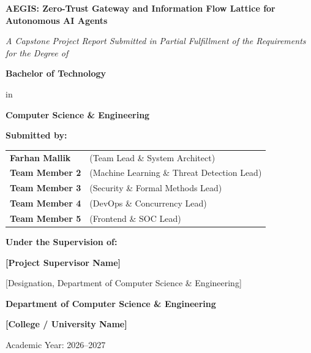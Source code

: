 \begin{titlepage}
\begin{center}

\vspace*{0.5cm}

{\Huge \bfseries AEGIS: Zero-Trust Gateway and Information Flow Lattice for Autonomous AI Agents\par}

\vspace{0.8cm}
{\Large \textit{A Capstone Project Report Submitted in Partial Fulfillment of the Requirements for the Degree of}\par}
\vspace{0.4cm}
{\Large \bfseries Bachelor of Technology\par}
{\large in\par}
{\Large \bfseries Computer Science \& Engineering\par}

\vspace{1.2cm}

{\large \textbf{Submitted by:}\par}
\vspace{0.3cm}
\begin{tabular}{ll}
\textbf{Farhan Mallik} & (Team Lead \& System Architect) \\
\textbf{Team Member 2} & (Machine Learning \& Threat Detection Lead) \\
\textbf{Team Member 3} & (Security \& Formal Methods Lead) \\
\textbf{Team Member 4} & (DevOps \& Concurrency Lead) \\
\textbf{Team Member 5} & (Frontend \& SOC Lead) \\
\end{tabular}

\vspace{1.2cm}

{\large \textbf{Under the Supervision of:}\par}
\vspace{0.2cm}
{\large \textbf{[Project Supervisor Name]}\par}
{\normalsize [Designation, Department of Computer Science \& Engineering]\par}

\vfill

\begin{figure}[h!]
\centering
\end{figure}

\vspace{0.5cm}

{\large \bfseries Department of Computer Science \& Engineering\par}
{\large \bfseries [College / University Name]\par}
{\normalsize Academic Year: 2026--2027\par}

\end{center}
\end{titlepage}
